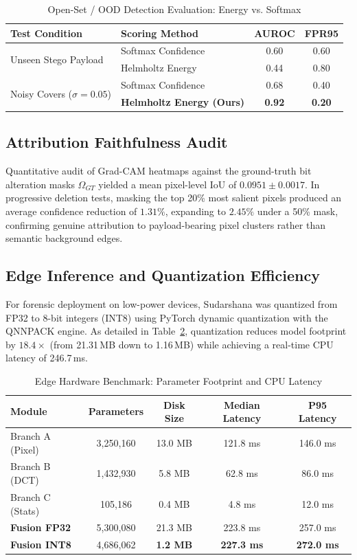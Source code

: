 \documentclass[journal]{IEEEtran}
\begin{document}
\begin{table}[h]
\centering
\caption{Open-Set / OOD Detection Evaluation: Energy vs. Softmax}
\label{tab:ood_results}
\begin{tabular}{@{}llcc@{}}
\toprule
\textbf{Test Condition} & \textbf{Scoring Method} & \textbf{AUROC} & \textbf{FPR95} \\ \midrule
\multirow{2}{*}{Unseen Stego Payload} & Softmax Confidence & 0.60 & 0.60 \\
 & Helmholtz Energy & 0.44 & 0.80 \\ \midrule
\multirow{2}{*}{Noisy Covers ($\sigma=0.05$)} & Softmax Confidence & 0.68 & 0.40 \\
 & \textbf{Helmholtz Energy (Ours)} & \textbf{0.92} & \textbf{0.20} \\ \bottomrule
\end{tabular}
\end{table}

\subsection{Attribution Faithfulness Audit}
Quantitative audit of Grad-CAM heatmaps against the ground-truth bit alteration masks $\Omega_{GT}$ yielded a mean pixel-level IoU of $0.0951 \pm 0.0017$. In progressive deletion tests, masking the top 20\% most salient pixels produced an average confidence reduction of $1.31\%$, expanding to $2.45\%$ under a 50\% mask, confirming genuine attribution to payload-bearing pixel clusters rather than semantic background edges.

\subsection{Edge Inference and Quantization Efficiency}
For forensic deployment on low-power devices, Sudarshana was quantized from FP32 to 8-bit integers (INT8) using PyTorch dynamic quantization with the QNNPACK engine. As detailed in Table~\ref{tab:benchmarks}, quantization reduces model footprint by $18.4\times$ (from 21.31\,MB down to 1.16\,MB) while achieving a real-time CPU latency of 246.7\,ms.

\begin{table}[h]
\centering
\caption{Edge Hardware Benchmark: Parameter Footprint and CPU Latency}
\label{tab:benchmarks}
\begin{tabular}{@{}lcccc@{}}
\toprule
\textbf{Module} & \textbf{Parameters} & \textbf{Disk Size} & \textbf{Median Latency} & \textbf{P95 Latency} \\ \midrule
Branch A (Pixel) & 3,250,160 & 13.0 MB & 121.8 ms & 146.0 ms \\
Branch B (DCT) & 1,432,930 & 5.8 MB & 62.8 ms & 86.0 ms \\
Branch C (Stats) & 105,186 & 0.4 MB & 4.8 ms & 12.0 ms \\
\textbf{Fusion FP32} & 5,300,080 & 21.3 MB & 223.8 ms & 257.0 ms \\
\textbf{Fusion INT8} & 4,686,062 & \textbf{1.2 MB} & \textbf{227.3 ms} & \textbf{272.0 ms} \\ \bottomrule
\end{tabular}
\end{table}
\end{document}
